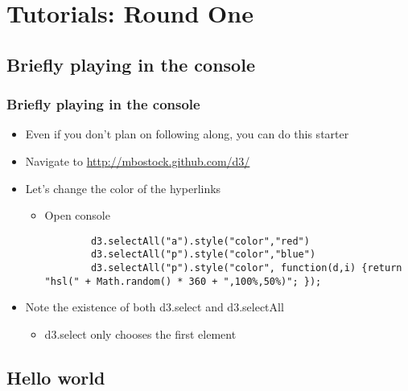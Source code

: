 \documentclass{beamer}
\begin{document}
\section{Tutorials: Round One}


\subsection{Briefly playing in the console}


\begin{frame}
    \frametitle{Briefly playing in the console}
    \begin{itemize}
    \item Even if you don't plan on following along, you can do this starter
    \item Navigate to \href{http://mbostock.github.com/d3/}{http://mbostock.github.com/d3/}
    \item Let's change the color of the hyperlinks
        \begin{itemize}
        \item Open console
        \begin{scriptsize}
        \begin{verbatim}
        d3.selectAll("a").style("color","red")
        d3.selectAll("p").style("color","blue")
        d3.selectAll("p").style("color", function(d,i) {return "hsl(" + Math.random() * 360 + ",100%,50%)"; });
        \end{verbatim}
        \end{scriptsize}
        \end{itemize}
    \item Note the existence of both d3.select and d3.selectAll
        \begin{itemize}
        \item d3.select only chooses the first element
        \end{itemize}
    \end{itemize}
\end{frame}


\subsection{Hello world}
\end{document}
